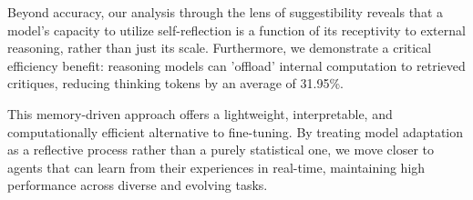 Beyond accuracy, our analysis through the lens of suggestibility reveals that a model's capacity to utilize self-reflection is a function of its receptivity to external reasoning, rather than just its scale. Furthermore, we demonstrate a critical efficiency benefit: reasoning models can 'offload' internal computation to retrieved critiques, reducing thinking tokens by an average of 31.95\%.

This memory-driven approach offers a lightweight, interpretable, and computationally efficient alternative to fine-tuning. By treating model adaptation as a reflective process rather than a purely statistical one, we move closer to agents that can learn from their experiences in real-time, maintaining high performance across diverse and evolving tasks.